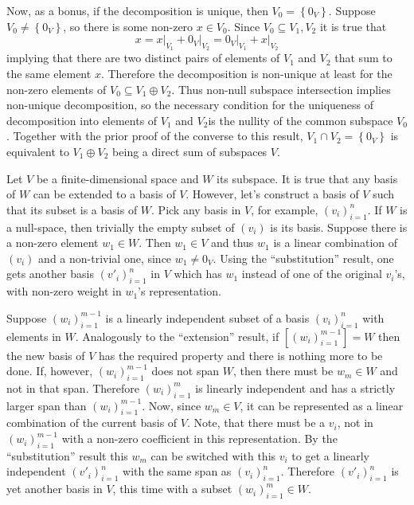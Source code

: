 \documentclass[a4paper]{article}
\newcommand{\obj}[1]{\ensuremath{\left\{ #1 \right\}}}
\newcommand{\brac}[1]{\ensuremath{\left( #1 \right)}}
\newcommand{\spn}[1]{\ensuremath{\left[ #1 \right]}}
\begin{document}
Now, as a bonus, if the decomposition is unique, then $V_0 = \obj{0_V}$. Suppose $V_0\neq \obj{0_V}$, so there is some non-zero $x\in V_0$. Since $V_0\subseteq V_1, V_2$ it is true that \[x = x\vert_{V_1} + 0_V\vert_{V_2} = 0_V\vert_{V_1} + x\vert_{V_2}\] implying that there are two distinct pairs of elements of $V_1$ and $V_2$ that sum to the same element $x$. Therefore the decomposition is non-unique at least for the non-zero elements of $V_0 \subseteq V_1\oplus V_2$. Thus non-null subspace intersection implies non-unique decomposition, so the necessary condition for the uniqueness of decomposition into elements of $V_1$ and $V_2$is the nullity of the common subspace $V_0$. Together with the prior proof of the converse to this result, $V_1\cap V_2 = \obj{0_V}$ is equivalent to $V_1\oplus V_2$ being a direct sum of subspaces $V$.

Let $V$ be a finite-dimensional space and $W$ its subspace. It is true that any basis of $W$ can be extended to a basis of $V$. However, let's construct a basis of $V$ such that its subset is a basis of $W$. Pick any basis in $V$, for example, $\brac{v_i}_{i=1}^n$. If $W$ is a null-space, then trivially the empty subset of $\brac{v_i}$ is its basis. Suppose there is a non-zero element $w_1\in W$. Then $w_1\in V$ and thus $w_1$ is a linear combination of $\brac{v_i}$ and a non-trivial one, since $w_1\neq 0_V$. Using the ``substitution'' result, one gets another basis $\brac{v'_i}_{i=1}^n$ in $V$ which has $w_1$ instead of one of the original $v_i$'s, with non-zero weight in $w_1$'s representation.

Suppose $\brac{w_i}_{i=1}^{m-1}$ is a linearly independent subset of a basis $\brac{v_i}_{i=1}^n$ with elements in $W$. Analogously to the ``extension'' result, if $\spn{\brac{w_i}_{i=1}^{m-1}} = W$ then the new basis of $V$ has the required property and there is nothing more to be done. If, however, $\brac{w_i}_{i=1}^{m-1}$ does not span $W$, then there must be $w_m\in W$ and not in that span. Therefore $\brac{w_i}_{i=1}^m$ is linearly independent and has a strictly larger span than $\brac{w_i}_{i=1}^{m-1}$. Now, since $w_m\in V$, it can be represented as a linear combination of the current basis of $V$. Note, that there must be a $v_i$, not in $\brac{w_i}_{i=1}^{m-1}$ with a non-zero coefficient in this representation. By the ``substitution'' result this $w_m$ can be switched with this $v_i$ to get a linearly independent $\brac{v'_i}_{i=1}^n$ with the same span as $\brac{v_i}_{i=1}^n$. Therefore $\brac{v'_i}_{i=1}^n$ is yet another basis in $V$, this time with a subset $\brac{w_i}_{i=1}^m\in W$.
\end{document}
